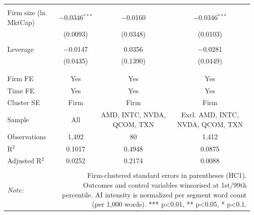\begin{table}[!htbp]
\begin{tabular}{@{\extracolsep{5pt}}lccc}
  & & & \\ 
 Firm size (ln MktCap) & $-$0.0346$^{***}$ & $-$0.0160 & $-$0.0346$^{***}$ \\ 
  & (0.0093) & (0.0348) & (0.0103) \\ 
  & & & \\ 
 Leverage & $-$0.0147 & 0.0356 & $-$0.0281 \\ 
  & (0.0435) & (0.1390) & (0.0449) \\ 
  & & & \\ 
\hline \\[-1.8ex] 
Firm FE & Yes & Yes & Yes \\ 
Time FE & Yes & Yes & Yes \\ 
Cluster SE & Firm & Firm & Firm \\ 
Sample & All & AMD, INTC, NVDA, QCOM, TXN & Excl. AMD, INTC, NVDA, QCOM, TXN \\ 
Observations & 1,492 & 80 & 1,412 \\ 
R$^{2}$ & 0.1017 & 0.4948 & 0.0875 \\ 
Adjusted R$^{2}$ & 0.0252 & 0.2174 & 0.0088 \\ 
\hline 
\hline \\[-1.8ex] 
\textit{Note:}  & \multicolumn{3}{r}{Firm-clustered standard errors in parentheses (HC1). Outcomes and control variables winsorised at 1st/99th percentile. AI intensity is normalized per segment word count (per 1,000 words). *** p<0.01, ** p<0.05, * p<0.1.} \\ 
\end{tabular} 
\end{table} 
